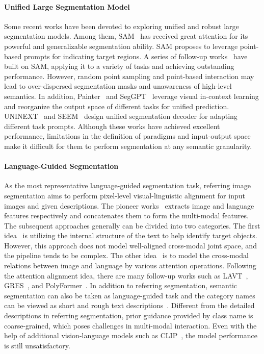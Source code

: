 \documentclass[10pt,twocolumn,letterpaper]{article}
\begin{document}
\paragraph{Unified Large Segmentation Model}
Some recent works have been devoted to exploring unified and robust large segmentation models. Among them, SAM~\cite{sam} has received great attention for its powerful and generalizable segmentation ability. SAM proposes to leverage point-based prompts for indicating target regions. A series of follow-up works~\cite{trackanything, semanticsam, ram} have built on SAM, applying it to a variety of tasks and achieving outstanding performance. However, random point sampling and point-based interaction may lead to over-dispersed segmentation masks and unawareness of high-level semantics. In addition, Painter~\cite{painter} and SegGPT~\cite{seggpt} leverage visual in-context learning and reorganize the output space of different tasks for unified prediction. UNINEXT~\cite{uninext} and SEEM~\cite{seem} design unified segmentation decoder for adapting different task prompts.
Although these works have achieved excellent performance, limitations in the definition of paradigms and input-output space make it difficult for them to perform segmentation at any semantic granularity.



\vspace{-5pt}
\paragraph{Language-Guided Segmentation}
As the most representative language-guided segmentation task, referring image segmentation aims to perform pixel-level visual-linguistic alignment for input images and given descriptions.
The pioneer works~\cite{early-work1,early-work2} extracts image and language features respectively and concatenates them to form the multi-modal features. 
The subsequent approaches generally can be divided into two categories.
The first idea~\cite{mattnet, cmpc, busnet} is utilizing the internal structure of the text to help identify target objects.
However, this approach does not model well-aligned cross-modal joint space, and the pipeline tends to be complex.
The other idea~\cite{step, cmsa, kwn, brinet, lts, efn, vlt, restr, lavt, cris} is to model the cross-modal relations between image and language by various attention operations.
Following the attention alignment idea, there are many follow-up works such as LAVT~\cite{lavt}, GRES~\cite{gres}, and PolyFormer~\cite{polyformer}. 
In addition to referring segmentation, semantic segmentation can also be taken as language-guided task and the category names can be viewed as short and rough text descriptions~\cite{lseg, Simbaseline, gkc, openseg}.
Different from  the detailed descriptions in referring segmentation, prior guidance provided by class name is coarse-grained, which poses challenges in multi-modal interaction. Even with the help of additional vision-language models such as CLIP~\cite{CLIP}, the model performance is still unsatisfactory.
\end{document}
